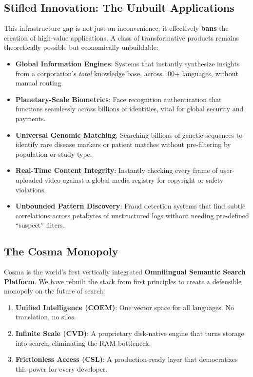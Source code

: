 \subsection{Stifled Innovation: The Unbuilt Applications}

This infrastructure gap is not just an inconvenience; it effectively \textbf{bans} the creation of high-value applications. A class of transformative products remains theoretically possible but economically unbuildable:

\begin{itemize}
    \item \textbf{Global Information Engines}: Systems that instantly synthesize insights from a corporation's \textit{total} knowledge base, across 100+ languages, without manual routing.
    \item \textbf{Planetary-Scale Biometrics}: Face recognition authentication that functions seamlessly across billions of identities, vital for global security and payments.
    \item \textbf{Universal Genomic Matching}: Searching billions of genetic sequences to identify rare disease markers or patient matches without pre-filtering by population or study type.
    \item \textbf{Real-Time Content Integrity}: Instantly checking every frame of user-uploaded video against a global media registry for copyright or safety violations.
    \item \textbf{Unbounded Pattern Discovery}: Fraud detection systems that find subtle correlations across petabytes of unstructured logs without needing pre-defined ``suspect'' filters.
\end{itemize}

\subsection{The Cosma Monopoly}

Cosma is the world's first vertically integrated \textbf{Omnilingual Semantic Search Platform}. We have rebuilt the stack from first principles to create a defensible monopoly on the future of search:

\begin{enumerate}[noitemsep]
    \item \textbf{Unified Intelligence (COEM)}: One vector space for all languages. No translation, no silos.
    \item \textbf{Infinite Scale (CVD)}: A proprietary disk-native engine that turns storage into search, eliminating the RAM bottleneck.
    \item \textbf{Frictionless Access (CSL)}: A production-ready layer that democratizes this power for every developer.
\end{enumerate}

